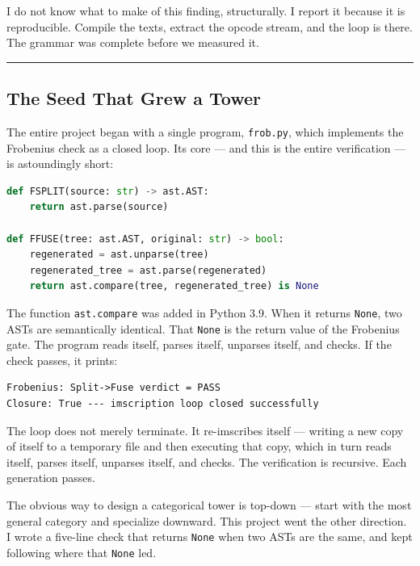 \documentclass[12pt,a4paper]{article}
\begin{document}
I do not know what to make of this finding, structurally. I report it because it is reproducible. Compile the texts, extract the opcode stream, and the loop is there. The grammar was complete before we measured it.

\begin{center}
\rule{0.5\textwidth}{0.4pt}
\end{center}

\subsection{The Seed That Grew a Tower}

The entire project began with a single program, \texttt{frob.py}, which implements the Frobenius check as a closed loop. Its core --- and this is the entire verification --- is astoundingly short:

\begin{lstlisting}[language=Python]
def FSPLIT(source: str) -> ast.AST:
    return ast.parse(source)

def FFUSE(tree: ast.AST, original: str) -> bool:
    regenerated = ast.unparse(tree)
    regenerated_tree = ast.parse(regenerated)
    return ast.compare(tree, regenerated_tree) is None
\end{lstlisting}

The function \texttt{ast.compare} was added in Python 3.9. When it returns \texttt{None}, two ASTs are semantically identical. That \texttt{None} is the return value of the Frobenius gate. The program reads itself, parses itself, unparses itself, and checks. If the check passes, it prints:

\begin{lstlisting}
Frobenius: Split->Fuse verdict = PASS
Closure: True --- imscription loop closed successfully
\end{lstlisting}

The loop does not merely terminate. It re-imscribes itself --- writing a new copy of itself to a temporary file and then executing that copy, which in turn reads itself, parses itself, unparses itself, and checks. The verification is recursive. Each generation passes.

The obvious way to design a categorical tower is top-down --- start with the most general category and specialize downward. This project went the other direction. I wrote a five-line check that returns \texttt{None} when two ASTs are the same, and kept following where that \texttt{None} led.
\end{document}
